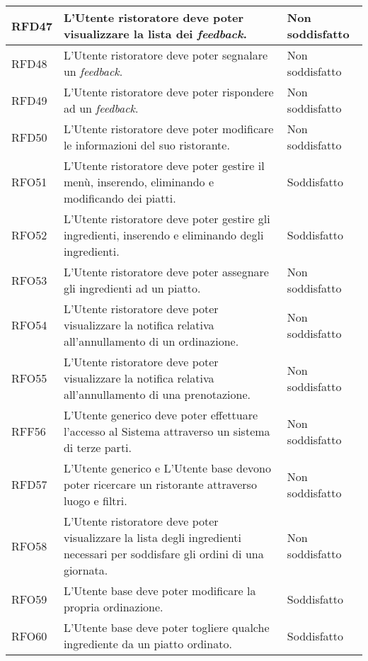 \begin{longtable}{|l|p{}|p{3cm}|}
	\hline
	RFD47       & L'Utente ristoratore deve poter visualizzare la lista dei \textit{feedback}.                                            & Non soddisfatto                     \\
	\hline
	RFD48       & L'Utente ristoratore deve poter segnalare un \textit{feedback}.                                                         & Non soddisfatto                        \\
	\hline
	RFD49       & L'Utente ristoratore deve poter rispondere ad un \textit{feedback}.                                                     & Non soddisfatto                            \\
	\hline
	RFD50       & L'Utente ristoratore deve poter modificare le informazioni del suo ristorante.                                          & Non soddisfatto                   \\
	\hline
	RFO51       & L'Utente ristoratore deve poter gestire il menù, inserendo, eliminando e modificando dei piatti.                        & Soddisfatto \\
	\hline
	RFO52       & L'Utente ristoratore deve poter gestire gli ingredienti, inserendo e eliminando degli ingredienti.                      & Soddisfatto \\
	\hline
	RFO53       & L'Utente ristoratore deve poter assegnare gli ingredienti ad un piatto.                                                 & Non soddisfatto \\
	\hline
	RFO54       & L'Utente ristoratore deve poter visualizzare la notifica relativa all'annullamento di un ordinazione.                   & Non soddisfatto \\
	\hline
	RFO55       & L'Utente ristoratore deve poter visualizzare la notifica relativa all'annullamento di una prenotazione.                 & Non soddisfatto \\
	\hline
	RFF56       & L'Utente generico deve poter effettuare l'accesso al Sistema attraverso un sistema di terze parti.                 	& Non soddisfatto \\
	\hline
	RFD57	   & L'Utente generico e L'Utente base devono poter ricercare un ristorante attraverso luogo e filtri.  					& Non soddisfatto \\
	\hline
	RFO58	   & L'Utente ristoratore deve poter visualizzare la lista degli ingredienti necessari per soddisfare gli ordini di una giornata. & Non soddisfatto \\ 
	\hline
	RFO59	   & L'Utente base deve poter modificare la propria ordinazione.  															& Soddisfatto \\
	\hline
	RFO60	   & L'Utente base deve poter togliere qualche ingrediente da un piatto ordinato. 										    & Soddisfatto \\	
	\hline
\end{longtable}
